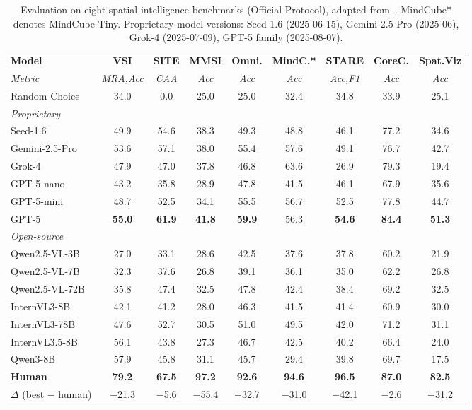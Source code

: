\documentclass[
hf,
]{confart}
\begin{document}
\begin{table}[htbp]
\centering
\caption{Evaluation on eight spatial intelligence benchmarks (Official Protocol), adapted from~\cite{cai2025holisticevaluationmultimodalllms}. MindCube* denotes MindCube-Tiny. Proprietary model versions: Seed-1.6 (2025-06-15), Gemini-2.5-Pro (2025-06), Grok-4 (2025-07-09), GPT-5 family (2025-08-07).}
\label{tab:main_results}
\renewcommand{\arraystretch}{1.1}
\footnotesize
\setlength{\tabcolsep}{4pt}
\begin{tabular}{lcccccccc}
\toprule
\textbf{Model} & \textbf{VSI} & \textbf{SITE} & \textbf{MMSI} & \textbf{Omni.} & \textbf{MindC.*} & \textbf{STARE} & \textbf{CoreC.} & \textbf{Spat.Viz} \\
\textit{Metric} & \textit{MRA,Acc} & \textit{CAA} & \textit{Acc} & \textit{Acc} & \textit{Acc} & \textit{Acc,F1} & \textit{Acc} & \textit{Acc} \\
\midrule
Random Choice & 34.0 & 0.0 & 25.0 & 25.0 & 32.4 & 34.8 & 33.9 & 25.1 \\
\midrule
\multicolumn{9}{l}{\textit{Proprietary}} \\
Seed-1.6 & 49.9 & 54.6 & 38.3 & 49.3 & 48.8 & 46.1 & 77.2 & 34.6 \\
Gemini-2.5-Pro & 53.6 & 57.1 & 38.0 & 55.4 & 57.6 & 49.1 & 76.7 & 42.7 \\
Grok-4 & 47.9 & 47.0 & 37.8 & 46.8 & 63.6 & 26.9 & 79.3 & 19.4 \\
GPT-5-nano & 43.2 & 35.8 & 28.9 & 47.8 & 41.5 & 46.1 & 67.9 & 35.6 \\
GPT-5-mini & 48.7 & 52.5 & 34.1 & 55.5 & 56.7 & 52.5 & 77.8 & 44.7 \\
GPT-5 & \textbf{55.0} & \textbf{61.9} & \textbf{41.8} & \textbf{59.9} & 56.3 & \textbf{54.6} & \textbf{84.4} & \textbf{51.3} \\
\midrule
\multicolumn{9}{l}{\textit{Open-source}} \\
Qwen2.5-VL-3B & 27.0 & 33.1 & 28.6 & 42.5 & 37.6 & 37.8 & 60.2 & 21.9 \\
Qwen2.5-VL-7B & 32.3 & 37.6 & 26.8 & 39.1 & 36.1 & 35.0 & 62.2 & 26.8 \\
Qwen2.5-VL-72B & 35.8 & 47.4 & 32.5 & 47.8 & 42.4 & 38.4 & 69.2 & 32.5 \\
InternVL3-8B & 42.1 & 41.2 & 28.0 & 46.3 & 41.5 & 41.4 & 60.9 & 30.0 \\
InternVL3-78B & 47.6 & 52.7 & 30.5 & 51.0 & 49.5 & 42.0 & 71.2 & 31.1 \\
InternVL3.5-8B & 56.1 & 43.8 & 27.3 & 46.7 & 42.5 & 40.2 & 66.4 & 24.0 \\
Qwen3-8B & 57.9 & 45.8 & 31.1 & 45.7 & 29.4 & 39.8 & 69.7 & 17.5 \\
\midrule
\textbf{Human} & \textbf{79.2} & \textbf{67.5} & \textbf{97.2} & \textbf{92.6} & \textbf{94.6} & \textbf{96.5} & \textbf{87.0} & \textbf{82.5} \\
$\Delta$ (best $-$ human) & $-$21.3 & $-$5.6 & $-$55.4 & $-$32.7 & $-$31.0 & $-$42.1 & $-$2.6 & $-$31.2 \\
\bottomrule
\end{tabular}
\end{table}
\end{document}
